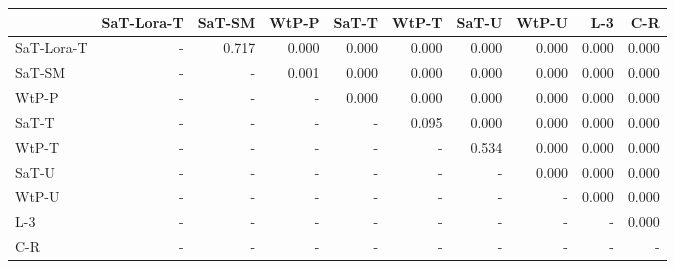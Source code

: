 \begin{tabular}{lrrrrrrrrr}
\toprule
 & SaT-Lora-T & SaT-SM & WtP-P & SaT-T & WtP-T & SaT-U & WtP-U & L-3 & C-R \\
\midrule
SaT-Lora-T & - & 0.717 & 0.000 & 0.000 & 0.000 & 0.000 & 0.000 & 0.000 & 0.000 \\
SaT-SM & - & - & 0.001 & 0.000 & 0.000 & 0.000 & 0.000 & 0.000 & 0.000 \\
WtP-P & - & - & - & 0.000 & 0.000 & 0.000 & 0.000 & 0.000 & 0.000 \\
SaT-T & - & - & - & - & 0.095 & 0.000 & 0.000 & 0.000 & 0.000 \\
WtP-T & - & - & - & - & - & 0.534 & 0.000 & 0.000 & 0.000 \\
SaT-U & - & - & - & - & - & - & 0.000 & 0.000 & 0.000 \\
WtP-U & - & - & - & - & - & - & - & 0.000 & 0.000 \\
L-3 & - & - & - & - & - & - & - & - & 0.000 \\
C-R & - & - & - & - & - & - & - & - & - \\
\bottomrule
\end{tabular}

